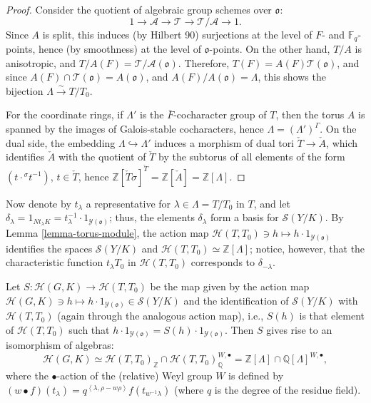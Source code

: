 \begin{proof}
 Consider the quotient of algebraic group schemes over $\mathfrak o$:
 $$ 1\to \mathcal A \to \mathcal T \to \mathcal T/\mathcal A\to 1.$$
 Since $A$ is split, this induces (by Hilbert 90) surjections at the level of $F$- and $\mathbb F_q$-points, hence (by smoothness) at the level of $\mathfrak o$-points.  On the other hand, $T/A$ is anisotropic, and $T/A(F)=\mathcal T/\mathcal A(\mathfrak o)$. Therefore, $T(F) = A(F) \mathcal T(\mathfrak o)$, and since $A(F)\cap \mathcal T(\mathfrak o) = A(\mathfrak o)$, and $A(F)/A(\mathfrak o) = \Lambda$, this shows the bijection $\Lambda \xrightarrow\sim T/T_0$.
 
 For the coordinate rings, if $\Lambda'$ is the $\bar F$-cocharacter group of $T$, then the torus $A$ is spanned by the images of Galois-stable cocharacters, hence $\Lambda = (\Lambda')^\Gamma$. On the dual side, the embedding $\Lambda \hookrightarrow \Lambda'$ induces a morphism of dual tori $\check T \to \check A$, which identifies $\check A$ with the quotient of $\check T$ by the subtorus of all elements of the form $(t\cdot {^\sigma t^{-1}})$, $t\in \check T$, hence   
 $\mathbb Z[\check T\sigma ]^{\check T} = \mathbb Z[\check A] = \mathbb Z[\Lambda]$.
\end{proof}

Now denote by $t_\lambda$ a representative for $\lambda \in \Lambda = T/T_0$ in $T$, and let $\delta_\lambda=1_{N t_\lambda K} = t_\lambda^{-1}\cdot 1_{\mathcal Y(\mathfrak o)}$; thus, the elements $\delta_\lambda$ form a basis for $\mathcal S(Y/K)$. By Lemma \ref{lemma-torus-module}, the action map $\mathcal H(T,T_0)\ni h \mapsto h\cdot 1_{\mathcal Y(\mathfrak o)}$ identifies the spaces $\mathcal S(Y/K)$ and $\mathcal H(T,T_0)\simeq \mathbb Z[\Lambda]$; notice, however, that the characteristic function $t_\lambda T_0$ in $\mathcal H(T,T_0)$ corresponds to $\delta_{-\lambda}$. 

\begin{theorem}
\label{theorem-Satake-isomorphism}
 Let $S: \mathcal H(G,K) \to \mathcal H(T,T_0)$ be the map given by the action map $\mathcal H(G,K)\ni h \mapsto h\cdot 1_{\mathcal Y(\mathfrak o)} \in \mathcal S(Y/K)$ and the identification of $\mathcal S(Y/K)$ with $\mathcal H(T,T_0)$ (again through the analogous action map), i.e., $S(h)$ is that element of $\mathcal H(T,T_0)$ such that $h\cdot 1_{\mathcal Y(\mathfrak o)} = S(h)\cdot 1_{\mathcal Y(\mathfrak o)} $. Then $S$ gives rise to an isomorphism of algebras: 
 \begin{equation}
 \label{equation-Satake}
 \mathcal H(G,K) \simeq \mathcal H(T,T_0)_{\mathbb Z} \cap \mathcal H(T,T_0)_{\mathbb Q}^{W,\bullet} = \mathbb Z[\Lambda]\cap \mathbb Q[\Lambda]^{W,\bullet},
 \end{equation}
 where the $\bullet$-action of the (relative) Weyl group $W$ is defined by $(w\bullet f)(t_\lambda)  = q^{\left < \lambda, \rho - w\rho \right>} f(t_{w^{-1}\lambda})$ (where $q$ is the degree of the residue field).
\end{theorem}

